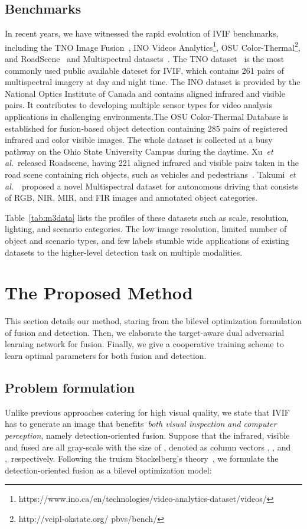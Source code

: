 \documentclass[10pt,twocolumn,letterpaper]{article}
\begin{document}
\subsection{Benchmarks}
In recent years, we have witnessed the rapid evolution of IVIF benchmarks, including the TNO Image Fusion~\cite{TNO}, INO Videos Analytics\footnote{https://www.ino.ca/en/technologies/video-analytics-dataset/videos/}, OSU Color-Thermal\footnote{http://vcipl-okstate.org/
	pbvs/bench/}, and RoadScene~\cite{U2Fusion2020} and Multispectral datasets~\cite{takumi2017multispectral}. The TNO dataset~\cite{TNO} is the most commonly used public available dateset for IVIF, which contains 261 pairs of multispectral imagery at day and night time. The INO dataset is provided by the National Optics Institute of Canada and contains aligned infrared and visible pairs. It contributes to developing multiple sensor types for video analysis applications in challenging environments.The OSU Color-Thermal Database is established for fusion-based object detection containing 285 pairs of registered infrared and color visible images. The whole dataset is collected at a busy pathway on the Ohio State University Campus during the daytime. Xu~\emph{et al.}~released Roadscene, having 221 aligned infrared and visible pairs taken in the road scene containing rich objects, such as vehicles and pedestrians~\cite{U2Fusion2020}. Takumi~\emph{et al.}~\cite{takumi2017multispectral}~proposed a novel Multispectral dataset for autonomous driving that consists of RGB, NIR, MIR, and FIR images and annotated object categories. 

Table~\ref{tab:m3data} lists the profiles of these datasets such as scale, resolution, lighting, and scenario categories. The low image resolution, limited number of object and scenario types, and few labels stumble wide applications of existing datasets to the higher-level detection task on multiple modalities.



\section{The Proposed Method}
This section details our method, staring from the bilevel optimization formulation of fusion and detection. Then, we elaborate the target-aware dual adversarial learning network for fusion. Finally, we give a cooperative training scheme to learn optimal parameters for both fusion and detection.
\subsection{Problem formulation}
Unlike previous approaches catering for high visual quality, we state that IVIF has to generate an image that benefits~\emph{both visual inspection and computer perception}, namely detection-oriented fusion. Suppose that the infrared, visible and fused are all gray-scale with the size of , denoted as column vectors , , and ,~respectively. 
Following the truism Stackelberg's theory~\cite{Ochs2015Bilevel,BILEVEL1,BILEVEL2}, we formulate the detection-oriented fusion as a bilevel optimization model: 
\vspace{-0.1cm} 
\end{document}
